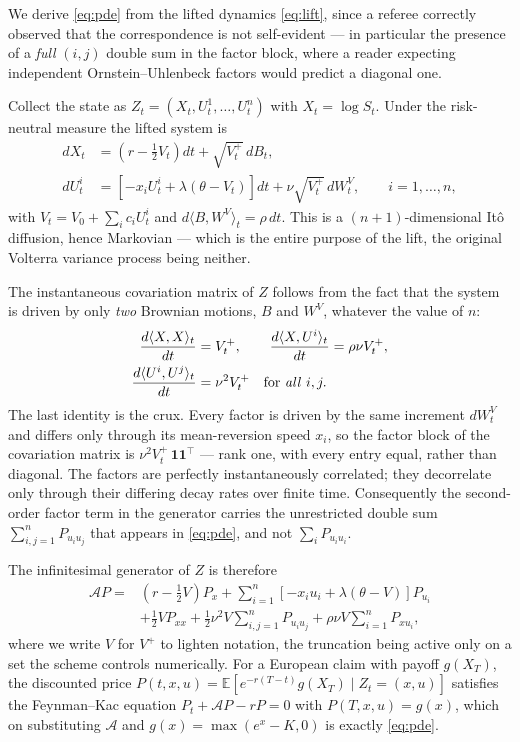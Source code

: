 \documentclass[preprint,12pt]{elsarticle}
\begin{document}
We derive \eqref{eq:pde} from the lifted dynamics \eqref{eq:lift}, since a
referee correctly observed that the correspondence is not self-evident --- in
particular the presence of a \emph{full} $(i,j)$ double sum in the factor block,
where a reader expecting independent Ornstein--Uhlenbeck factors would predict a
diagonal one.

Collect the state as $Z_t=(X_t,U^1_t,\ldots,U^n_t)$ with $X_t=\log S_t$. Under
the risk-neutral measure the lifted system is
\begin{align}
  dX_t   &= \left(r-\tfrac12 V_t\right)dt + \sqrt{V^+_t}\,dB_t, \\
  dU^i_t &= \left[-x_i U^i_t + \lambda(\theta-V_t)\right]dt
            + \nu\sqrt{V^+_t}\,dW^V_t, \qquad i=1,\ldots,n,
\end{align}
with $V_t=V_0+\sum_i c_i U^i_t$ and $d\langle B,W^V\rangle_t=\rho\,dt$. This is
a $(n{+}1)$-dimensional It\^o diffusion, hence Markovian --- which is the entire
purpose of the lift, the original Volterra variance process being neither.

The instantaneous covariation matrix of $Z$ follows from the fact that the
system is driven by only \emph{two} Brownian motions, $B$ and $W^V$, whatever
the value of $n$:
\begin{equation}
  \begin{split}
  \frac{d\langle X,X\rangle_t}{dt}&=V^+_t,
  \qquad
  \frac{d\langle X,U^i\rangle_t}{dt}=\rho\nu V^+_t,\\
  \frac{d\langle U^i,U^j\rangle_t}{dt}&=\nu^2 V^+_t
  \quad\text{for \emph{all} }i,j.
  \end{split}
\end{equation}
The last identity is the crux. Every factor is driven by the same increment
$dW^V_t$ and differs only through its mean-reversion speed $x_i$, so the factor
block of the covariation matrix is $\nu^2V^+_t\,\mathbf{1}\mathbf{1}^{\!\top}$
--- rank one, with every entry equal, rather than diagonal. The factors are
perfectly instantaneously correlated; they decorrelate only through their
differing decay rates over finite time. Consequently the second-order factor
term in the generator carries the unrestricted double sum
$\sum_{i,j=1}^{n}P_{u_iu_j}$ that appears in \eqref{eq:pde}, and not
$\sum_{i}P_{u_iu_i}$.

The infinitesimal generator of $Z$ is therefore
\begin{align}
  \mathcal{A}P = {}& \left(r-\tfrac12 V\right)P_x
      + \sum_{i=1}^{n}\left[-x_i u_i+\lambda(\theta-V)\right]P_{u_i}
      \nonumber\\
    & + \tfrac12 V P_{xx}
      + \tfrac12\nu^2 V\sum_{i,j=1}^{n}P_{u_iu_j}
      + \rho\nu V\sum_{i=1}^{n}P_{xu_i},
\end{align}
where we write $V$ for $V^+$ to lighten notation, the truncation being active
only on a set the scheme controls numerically. For a European claim with payoff
$g(X_T)$, the discounted price $P(t,x,u)=\mathbb{E}\!\left[e^{-r(T-t)}g(X_T)\mid
Z_t=(x,u)\right]$ satisfies the Feynman--Kac equation
$P_t+\mathcal{A}P-rP=0$ with $P(T,x,u)=g(x)$, which on substituting
$\mathcal{A}$ and $g(x)=\max(e^{x}-K,0)$ is exactly \eqref{eq:pde}.
\end{document}
